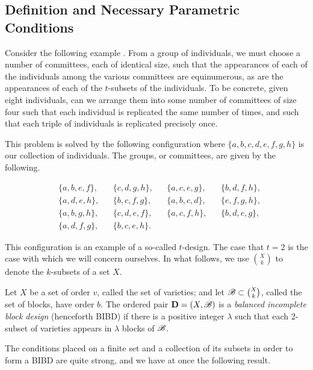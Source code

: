 \documentclass[../../../main]{subfiles}
\begin{document}
\subsection{Definition and Necessary Parametric Conditions}

 Consider the following example \cite[see][\S 2.5]{error-correcting-codes-v1}. From a group of individuals, we must choose a number of committees, each of identical size, such that the appearances of each of the individuals among the various committees are equinumerous, as are the appearances of each of the $t$-subsets of the individuals. To be concrete, given eight individuals, can we arrange them into some number of committees of size four such that each individual is replicated the same number of times, and such that each triple of individuals is replicated precisely once.
 
 This problem is solved by the following configuration where $\{a, b, c, d, e, f, g, h\}$ is our collection of individuals. The groups, or committees, are given by the following.
 
 \begin{align*}
  &\{a,b,e,f\}, & &\{c,d,g,h\}, & &\{a,c,e,g\}, & &\{b,d,f,h\}, \\
  &\{a,d,e,h\}, & &\{b,c,f,g\}, & &\{a,b,c,d\}, & &\{e,f,g,h\}, \\
  &\{a,b,g,h\}, & &\{c,d,e,f\}, & &\{a,c,f,h\}, & &\{b,d,e,g\}, \\
  &\{a,d,f,g\}, & &\{b,c,e,h\}. 
 \end{align*}
 
 This configuration is an example of a so-called $t$-design. The case that $t=2$ is the case with which we will concern ourselves. In what follows, we use $\binom{X}{k}$ to denote the $k$-subsets of a set $X$.
 
 \begin{defin}\label{bibd}
 Let $X$ be a set of order $v$, called the set of varieties; and let $\mathscr{B} \subset \binom{X}{k}$, called the set of blocks, have order $b$. The ordered pair $\mathbf{D}=(X,\mathscr{B})$ is a {\it balanced incomplete block design} (henceforth BIBD) if there is a positive integer $\lambda$ such that each 2-subset of varieties appears in $\lambda$ blocks of $\mathscr{B}$. \\
 \end{defin}
 
 The conditions placed on a finite set and a collection of its subsets in order to form a BIBD are quite strong, and we have at once the following result.
\end{document}
